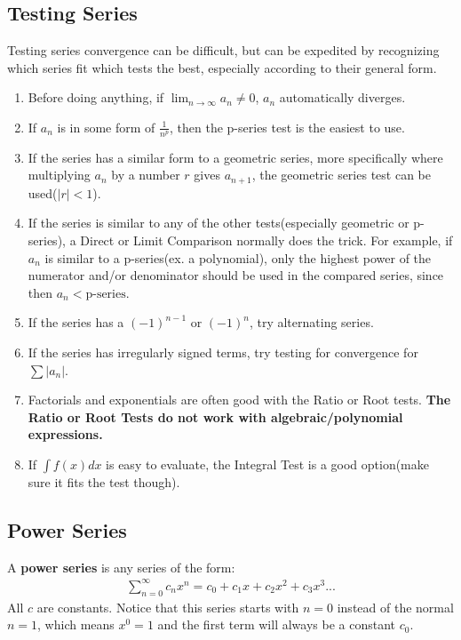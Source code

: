 \documentclass{article}
\begin{document}
\subsection{Testing Series}
Testing series convergence can be difficult, but can be expedited by recognizing which series fit which tests the best, especially according to their general form.
\begin{enumerate}
    \item Before doing anything, if $\lim_{n \to \infty} a_n \neq 0$, $a_n$ automatically diverges.
    \item If $a_n$ is in some form of $\frac{1}{n^p}$, then the p-series test is the easiest to use.
    \item If the series has a similar form to a geometric series, more specifically where multiplying $a_n$ by a number $r$ gives $a_{n+1}$, the geometric series test can be used($|r| < 1$).
    \item If the series is similar to any of the other tests(especially geometric or p-series), a Direct or Limit Comparison normally does the trick. For example, if $a_n$ is similar to a p-series(ex. a polynomial), only the highest power of the numerator and/or denominator should be used in the compared series, since then $a_n < \textrm{p-series.}$
    \item If the series has a $(-1)^{n-1}$ or $(-1)^n$, try alternating series.
    \item If the series has irregularly signed terms, try testing for convergence for $\sum |a_n|$.
    \item Factorials and exponentials are often good with the Ratio or Root tests. \textbf{The Ratio or Root Tests do not work with algebraic/polynomial expressions.}
    \item If $\int f(x) dx$ is easy to evaluate, the Integral Test is a good option(make sure it fits the test though).
\end{enumerate}
\subsection{Power Series}
A \textbf{power series} is any series of the form:
\
\begin{gather*}
    \sum_{n=0}^\infty c_n x^n = c_0 + c_1 x + c_2 x^2 + c_3 x^3...
\end{gather*}
All $c$ are constants. Notice that this series starts with $n = 0$ instead of the normal $n=1$, which means $x^0 = 1$ and the first term will always be a constant $c_0$.
\end{document}
